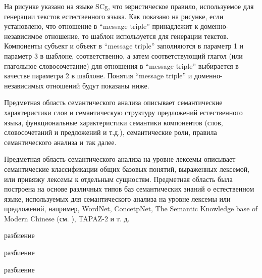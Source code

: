 На рисунке \textit{} указано на языке SCg, что эвристическое правило, используемое для генерации текстов естественного языка. Как показано на рисунке, если установлено, что отношение в ``message triple'' принадлежит к доменно-независимое отношение, то шаблон используется для генерации текстов. Компоненты субъект и объект в ``message triple'' заполняются в параметр 1 и параметр 3 в шаблоне, соответственно, а затем соответствующий глагол (или глагольное словосочетание) для отношения в ``message triple'' выбирается в качестве параметра 2 в шаблоне. Понятия ``message triple'' и доменно-независимых отношений будут показаны ниже.

Предметная область семантического анализа описывает семантические характеристики слов и семантическую структуру предложений естественного языка, функциональные характеристики семантики компонентов (слов, словосочетаний и предложений и т.д.), семантические роли, правила семантического анализа и так далее.

Предметная область семантического анализа на уровне лексемы описывает семантические классификации общих базовых понятий, выраженных лексемой, или привязку лексемы к отдельным сущностям. Предметная область была построена на основе различных типов баз семантических знаний о естественном языке, используемых для семантического анализа на уровне лексемы или предложений, например, WordNet, ConcetpNet, The Semantic Knowledge base of Modern Chinese (см. ), TAPAZ-2 и т. д.

\begin{SCn}
\end{SCn}


\begin{SCn}
	\begin{scnrelfromset}{разбиение}
		\begin{scnindent}
			\begin{scnrelfromset}{разбиение}
			\end{scnrelfromset}
		\end{scnindent}
		\scnitem {объект*}
		\begin{scnindent}
			\begin{scnrelfromset}{разбиение}
				\scnitem {покрытие*}
				\scnitem {корпус*}
				\scnitem {прослойка*}
				\scnitem {сердцевина*}
			\end{scnrelfromset}
		\end{scnindent}
	\end{scnrelfromset}
\end{SCn}

